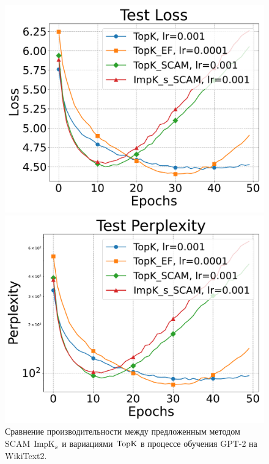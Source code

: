 \begin{figure}[ht]
\begin{minipage}{0.45\textwidth}
        \end{minipage}
        \begin{minipage}{0.45\textwidth}
            \includegraphics[width=\textwidth]{figures/gpt2/experiment2/Test Loss.pdf}
        \end{minipage}
        \begin{minipage}{0.45\textwidth}
            \includegraphics[width=\textwidth]{figures/gpt2/experiment2/Test Perplexity.pdf}
        \end{minipage}
        \caption{Сравнение производительности между предложенным методом SCAM $\operatorname{ImpK}_s$ и вариациями $\operatorname{TopK}$ в процессе обучения GPT-2 на WikiText2.}
    \end{figure}

